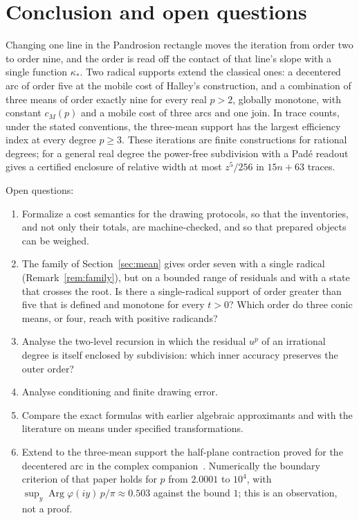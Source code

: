 \section{Conclusion and open questions}\label{sec:conclusion}

Changing one line in the Pandrosion rectangle moves the iteration from order two to order nine, and the
order is read off the contact of that line's slope with a single function $\kappa_*$. Two radical
supports extend the classical ones: a decentered arc of order five at the mobile cost of Halley's
construction, and a combination of three means of order exactly nine for every real $p>2$, globally
monotone, with constant $c_M(p)$ and a mobile cost of three arcs and one join. In trace counts, under
the stated conventions, the three-mean support has the largest efficiency index at every degree
$p\ge3$. These iterations are finite constructions for rational degrees; for a general real degree the
power-free subdivision with a Pad\'e readout gives a certified enclosure of relative width at most
$z^{5}/256$ in $15n+63$ traces.

Open questions:
\begin{enumerate}[label=\arabic*.]
\item Formalize a cost semantics for the drawing protocols, so that the inventories, and not only
  their totals, are machine-checked, and so that prepared objects can be weighed.
\item The family of Section~\ref{sec:mean} gives order seven with a single radical
  (Remark~\ref{rem:family}), but on a bounded range of residuals and with a state that crosses the
  root. Is there a single-radical support of order greater than five that is defined and monotone for
  every $t>0$? Which order do three conic means, or four, reach with positive radicands?
\item Analyse the two-level recursion in which the residual $u^{p}$ of an irrational degree is itself
  enclosed by subdivision: which inner accuracy preserves the outer order?
\item Analyse conditioning and finite drawing error.
\item Compare the exact formulas with earlier algebraic approximants and with the literature on means
  under specified transformations.
\item Extend to the three-mean support the half-plane contraction proved for the decentered arc in the
  complex companion~\cite{companion}. Numerically the boundary criterion of that paper holds for $p$
  from $2.0001$ to $10^{4}$, with $\sup_y\operatorname{Arg}\varphi(iy)\,p/\pi\approx0.503$ against the
  bound $1$; this is an observation, not a proof.
\end{enumerate}


